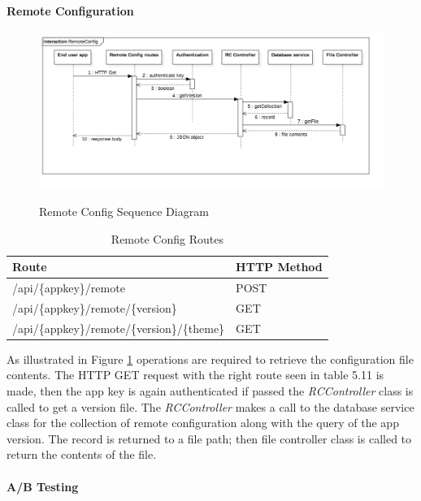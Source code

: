 \paragraph{Remote Configuration}

\begin{figure}[!h]
    \caption{Remote Config Sequence Diagram}
    \centering
    \includegraphics[width=150mm]{images/sequence/RemoteConfig}
    \label{fig:rc-seq}
\end{figure}

\begin{table}[!h]
\centering
\caption{Remote Config Routes}
\label{tb:rc-routes}
\begin{tabular}{|l|l|}
\hline
\rowcolor{green!20}
Route                                        & HTTP Method \\ \hline
/api/\{appkey\}/remote                       & POST        \\ \hline
/api/\{appkey\}/remote/\{version\}           & GET         \\ \hline
/api/\{appkey\}/remote/\{version\}/\{theme\} & GET         \\ \hline
\end{tabular}
\end{table}

As illustrated in Figure \ref{fig:rc-seq} operations are required to retrieve the configuration file contents. The HTTP GET request with the right route seen in table 5.11 is made, then the app key is again authenticated if passed the \textit{RCController} class is called to get a version file. The \textit{RCController} makes a call to the database service class for the collection of remote configuration along with the query of the app version. The record is returned to a file path; then file controller class is called to return the contents of the file.

\paragraph{A/B Testing}

